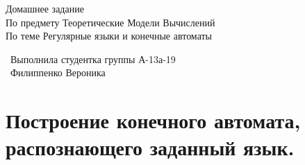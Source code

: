 \documentclass{article}
\begin{document}

\begin{center}

\large{Домашнее задание}\\
\large{По предмету Теоретические Модели Вычислений}\\
\large{По теме Регулярные языки и конечные автоматы}\\

\hfill \break
\hfill \break
\hfill \break
\hfill \break
\hfill \break

\ Выполнила студентка группы А-13а-19\\
\ Филиппенко Вероника\\

\hfill \break

\end{center}



\newpage

    \tableofcontents
    
\newpage

 

\newpage

\section{Построение конечного автомата, распознающего заданный язык.}
\end{document}
